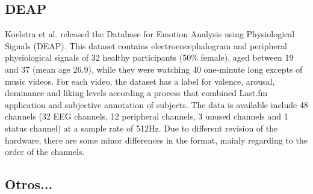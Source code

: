 \documentclass{sig-alternate}
\begin{document}
\subsection{DEAP}
Koelstra et al. \cite{deap2011} released the Database for Emotion Analysis 
using Physiological Signals (DEAP). This dataset contains electroencephalogram 
and peripheral physiological signals of 32 healthy participants (50\% female), 
aged between 19 and 37 (mean age 26.9), while they were watching
40 one-minute long excepts of music videos. For each video, the dataset has 
a label for valence, arousal, dominance and liking levels according a process 
that combined  Last.fm application and subjective annotation of subjects.  The data 
is available include 48 channels (32 EEG channels, 12 peripheral channels, 3 
unused channels and 1 status channel) at a sample rate of 512Hz. Due to
 different revision of the hardware, there are some minor differences in the 
 format, mainly regarding to the order of the  channels.


\subsection{Otros...}

    
\end{document}
